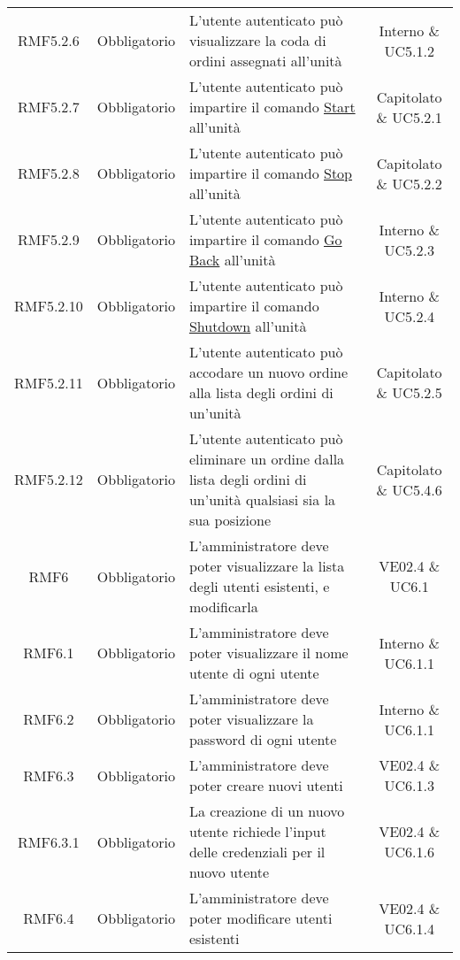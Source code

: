 \begin{longtable}[h!] { c c m{8cm} c}
		RMF5.2.6 & Obbligatorio & L'utente autenticato può visualizzare la coda di ordini assegnati all'unità & Interno \& UC5.1.2 \\
		
		RMF5.2.7 & Obbligatorio & L'utente autenticato può impartire il comando \underline{Start} all'unità & Capitolato \& UC5.2.1 \\
		
		RMF5.2.8 & Obbligatorio & L'utente autenticato può impartire il comando \underline{Stop} all'unità & Capitolato \& UC5.2.2 \\
		
		RMF5.2.9 & Obbligatorio & L'utente autenticato può impartire il comando \underline{Go Back} all'unità & Interno \& UC5.2.3 \\
		
		RMF5.2.10 & Obbligatorio & L'utente autenticato può impartire il comando \underline{Shutdown} all'unità & Interno \& UC5.2.4 \\
		
		RMF5.2.11 & Obbligatorio & L'utente autenticato può accodare un nuovo ordine alla lista degli ordini di un'unità & Capitolato \& UC5.2.5 \\
		
		RMF5.2.12 & Obbligatorio & L'utente autenticato può eliminare un ordine dalla lista degli ordini di un'unità qualsiasi sia la sua posizione & Capitolato \& UC5.4.6 \\
		
		RMF6 & Obbligatorio & L'amministratore deve poter visualizzare la lista degli utenti esistenti, e modificarla & VE02.4 \& UC6.1 \\
		
		RMF6.1 & Obbligatorio & L'amministratore deve poter visualizzare il nome utente di ogni utente & Interno \& UC6.1.1 \\
		
		RMF6.2 & Obbligatorio & L'amministratore deve poter visualizzare la password di ogni utente & Interno \& UC6.1.1 \\
		
		RMF6.3 & Obbligatorio & L'amministratore deve poter creare nuovi utenti & VE02.4 \& UC6.1.3 \\
		
		RMF6.3.1 & Obbligatorio & La creazione di un nuovo utente richiede l'input delle credenziali per il nuovo utente & VE02.4 \& UC6.1.6 \\
		
		RMF6.4 & Obbligatorio & L'amministratore deve poter modificare utenti esistenti & VE02.4 \& UC6.1.4 \\
		

\end{longtable}
